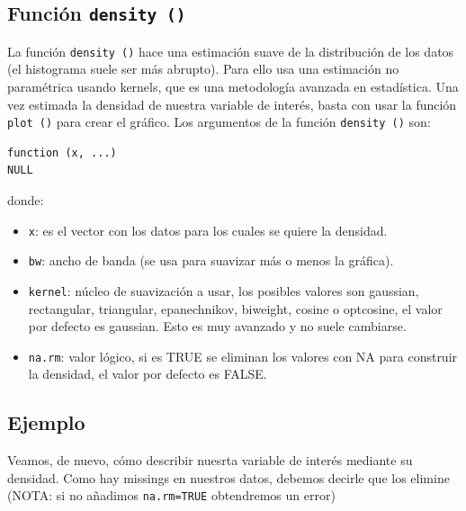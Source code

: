 \documentclass[
]{book}
\newenvironment{Shaded}{\begin{snugshade}}{\end{snugshade}}
\newcommand{\AttributeTok}[1]{\textcolor[rgb]{0.77,0.63,0.00}{#1}}
\newcommand{\ConstantTok}[1]{\textcolor[rgb]{0.00,0.00,0.00}{#1}}
\newcommand{\FunctionTok}[1]{\textcolor[rgb]{0.00,0.00,0.00}{#1}}
\newcommand{\NormalTok}[1]{#1}
\newcommand{\SpecialCharTok}[1]{\textcolor[rgb]{0.00,0.00,0.00}{#1}}
\providecommand{\tightlist}{%
  \setlength{\itemsep}{0pt}\setlength{\parskip}{0pt}}
\begin{document}
\hypertarget{funciuxf3n-density}{%
\subsection{\texorpdfstring{Función \texttt{density\ ()}}{Función density ()}}\label{funciuxf3n-density}}

La función \texttt{density\ ()} hace una estimación suave de la distribución de los datos (el histograma suele ser más abrupto). Para ello usa una estimación no paramétrica usando kernels, que es una metodología avanzada en estadística. Una vez estimada la densidad de nuestra variable de interés, basta con usar la función \texttt{plot\ ()} para crear el gráfico. Los argumentos de la función \texttt{density\ ()} son:

\begin{verbatim}
function (x, ...) 
NULL
\end{verbatim}

donde:

\begin{itemize}
\tightlist
\item
  \texttt{x}: es el vector con los datos para los cuales se quiere la densidad.
\item
  \texttt{bw}: ancho de banda (se usa para suavizar más o menos la gráfica).
\item
  \texttt{kernel}: núcleo de suavización a usar, los posibles valores son gaussian, rectangular, triangular, epanechnikov, biweight, cosine o optcosine, el valor por defecto es gaussian. Esto es muy avanzado y no suele cambiarse.
\item
  \texttt{na.rm}: valor lógico, si es TRUE se eliminan los valores con NA para construir la densidad, el valor por defecto es FALSE.
\end{itemize}

\hypertarget{ejemplo-8}{%
\subsection*{Ejemplo}\label{ejemplo-8}}

Veamos, de nuevo, cómo describir nuesrta variable de interés mediante su densidad. Como hay missings en nuestros datos, debemos decirle que los elimine (NOTA: si no añadimos \texttt{na.rm=TRUE} obtendremos un error)

\begin{Shaded}
\end{Shaded}
\end{document}
